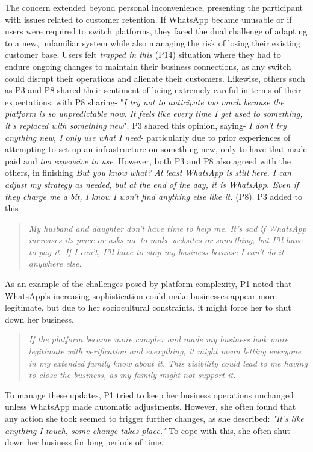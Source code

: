 The concern extended beyond personal inconvenience, presenting the participant with issues related to customer retention. If WhatsApp became unusable or if users were required to switch platforms, they faced the dual challenge of adapting to a new, unfamiliar system while also managing the risk of losing their existing customer base. Users felt \textit{trapped in this} (P14) situation where they had to endure ongoing changes to maintain their business connections, as any switch could disrupt their operations and alienate their customers. Likewise, others such as P3 and P8 shared their sentiment of being extremely careful in terms of their expectations, with P8 sharing- "\textit{I try not to anticipate too much because the platform is so unpredictable now. It feels like every time I get used to something, it’s replaced with something new}". P3 shared this opinion, saying- \textit{I don't try anything new, I only use what I need}- particularly due to prior experiences of attempting to set up an infrastructure on something new, only to have that made paid and \textit{too expensive to use}. However, both P3 and P8 also agreed with the others, in finishing \textit{But you know what? At least WhatsApp is still here. I can adjust my strategy as needed, but at the end of the day, it is WhatsApp. Even if they charge me a bit, I know I won't find anything else like it.} (P8). P3 added to this-

\begin{quote}
    \textit{My husband and daughter don’t have time to help me. It’s sad if WhatsApp increases its price or asks me to make websites or something, but I’ll have to pay it. If I can’t, I’ll have to stop my business because I can’t do it anywhere else.}
\end{quote}


As an example of the challenges posed by platform complexity, P1 noted that WhatsApp's increasing sophistication could make businesses appear more legitimate, but due to her sociocultural constraints, it might force her to shut down her business.

\begin{quote}
    \textit{If the platform became more complex and made my business look more legitimate with verification and everything, it might mean letting everyone in my extended family know about it. This visibility could lead to me having to close the business, as my family might not support it.}
\end{quote}

To manage these updates, P1 tried to keep her business operations unchanged unless WhatsApp made automatic adjustments. However, she often found that any action she took seemed to trigger further changes, as she described: \textit{"It’s like anything I touch, some change takes place."} To cope with this, she often shut down her business for long periods of time. 

